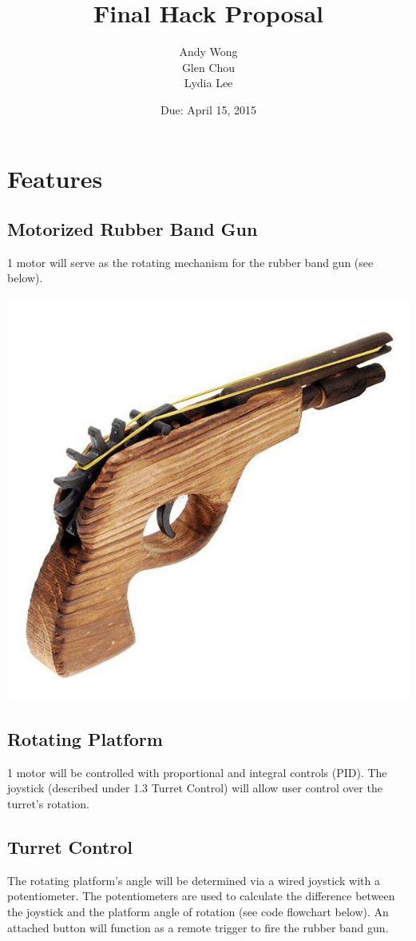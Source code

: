 \documentclass[a4paper, 11pt]{article}
\title{Final Hack Proposal}\author{Andy Wong\\Glen Chou\\Lydia Lee}\date{Due: April 15, 2015}
\begin{document}
\pagestyle{fancy}
\fancyhf{}
\maketitle
\tableofcontents
\newpage
\section{Features}
	\subsection{Motorized Rubber Band Gun}
		1 motor will serve as the rotating mechanism for the rubber band gun (see below).
		\begin{center}
			\includegraphics[scale=.45]{proposal-images/rubber-band-gun}
		\end{center}
	\subsection{Rotating Platform}
		1 motor will be controlled with proportional and integral controls (PID).  The joystick (described under 1.3 Turret Control) will allow user control over the turret's rotation. 
	\subsection{Turret Control}
		The rotating platform's angle will be determined via a wired joystick with a potentiometer.  The potentiometers are used to calculate the difference between the joystick and the platform angle of rotation (see code flowchart below).  An attached button will function as a remote trigger to fire the rubber band gun.
\newpage
\end{document}

